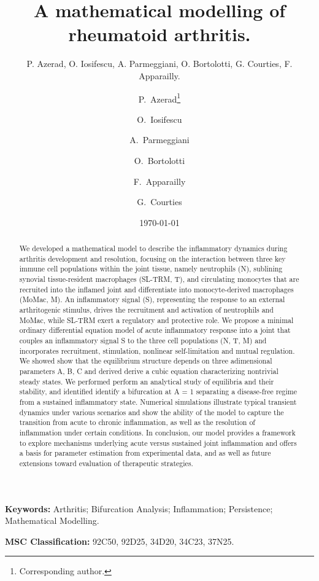 \documentclass[a4paper, 12pt]{article}
\title{A mathematical modelling of rheumatoid arthritis.}
\author{ P. Azerad, O. Iosifescu, A. Parmeggiani, O. Bortolotti,  G. Courties, F. Apparailly. }
\date{\today}
\author[1]{P.~Azerad\thanks{Corresponding author.}}
\author[1]{O.~Iosifescu}
\author[2]{A.~Parmeggiani}
\author[3]{O.~Bortolotti}
\author[3,4]{F.~Apparailly}
\author[3]{G.~Courties}
\affil[1]{IMAG, UMR5149, Université de Montpellier, France}
\affil[2]{L2C, UMR5221, Université de Montpellier, France}
\affil[3]{IRMB, UMR1183, Université de Montpellier, INSERM, France}
\affil[4]{Clinical Department for osteoarticular diseases, Montpellier University Hospital Lapeyronie, France}
\newcommand{\keywords}[1]{%
  \par\noindent\textbf{Keywords: }#1 %
}
\newcommand{\msc}[1]{%
  \par\noindent\textbf{MSC Classification: }#1 %
}
\providecommand{\DIFaddtex}[1]{{\protect\color{blue} \sf #1}} %
\providecommand{\DIFdeltex}[1]{{\protect\color{red} \scriptsize #1}} %
\providecommand{\DIFaddbegin}{} %
\providecommand{\DIFaddend}{} %
\providecommand{\DIFdelbegin}{} %
\providecommand{\DIFdelend}{} %
\providecommand{\DIFadd}[1]{\texorpdfstring{\DIFaddtex{#1}}{#1}} %
\providecommand{\DIFdel}[1]{\texorpdfstring{\DIFdeltex{#1}}{}} %
\begin{document}
\maketitle 
\begin{abstract}
We developed a mathematical model to describe the inflammatory dynamics 
during arthritis development and resolution, focusing on the interaction between three key immune cell populations 
within the joint tissue, namely neutrophils (N),  sublining synovial tissue-resident macrophages (SL-TRM, T),
 and circulating monocytes that are recruited into the inflamed joint and differentiate into monocyte-derived macrophages (MoMac, M).
An inflammatory signal (S), representing the response to an external arthritogenic stimulus, 
drives the recruitment and activation of neutrophils and MoMac, while SL-TRM exert a regulatory and protective role.
We propose a minimal ordinary differential equation model of acute inflammatory response into a joint that couples an inflammatory signal S to the three cell populations (N, T, M) and incorporates recruitment, stimulation, nonlinear self-limitation and mutual regulation.
 We \DIFdelbegin \DIFdel{showed }\DIFdelend \DIFaddbegin \DIFadd{show }\DIFaddend that the equilibrium structure depends on three adimensional parameters A, B, C and \DIFdelbegin \DIFdel{derived }\DIFdelend \DIFaddbegin \DIFadd{derive }\DIFaddend a cubic equation characterizing nontrivial steady states.
We \DIFdelbegin \DIFdel{performed }\DIFdelend \DIFaddbegin \DIFadd{perform }\DIFaddend an analytical study of equilibria and their stability, and \DIFdelbegin \DIFdel{identified }\DIFdelend \DIFaddbegin \DIFadd{identify }\DIFaddend a bifurcation at A = 1 separating a disease-free regime from a sustained inflammatory state. 
Numerical simulations illustrate typical transient dynamics under various scenarios and show the ability of the model to capture the transition from acute to chronic inflammation, as well as the resolution of inflammation under certain conditions. 
In conclusion, our model provides a framework to explore mechanisms underlying acute versus sustained joint inflammation and offers a basis for parameter estimation from experimental data, \DIFdelbegin \DIFdel{and }\DIFdelend \DIFaddbegin \DIFadd{as well as }\DIFaddend future extensions toward evaluation of therapeutic strategies.

\end{abstract}
\DIFdelbegin %
\DIFdelend \DIFaddbegin \keywords{Arthritis;  Bifurcation Analysis; Inflammation; Persistence; Mathematical Modelling.}
\DIFaddend \msc{92C50, 92D25, 34D20, 34C23, 37N25.}
\end{document}
